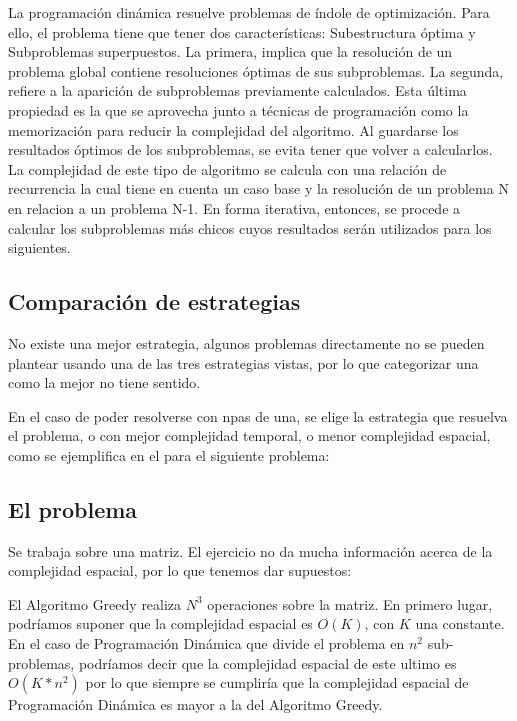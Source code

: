 \documentclass[titlepage,a4paper]{article}
\begin{document}
La programación dinámica resuelve problemas de índole de optimización. Para 
ello, el problema tiene que tener dos características: Subestructura óptima y 
Subproblemas superpuestos. La primera, implica que la resolución de un 
problema global contiene resoluciones óptimas de sus subproblemas. La segunda, 
refiere a la aparición de subproblemas previamente calculados. Esta última 
propiedad es la que se aprovecha junto a técnicas de programación como la 
memorización para reducir la complejidad del algoritmo. Al guardarse los 
resultados óptimos de los subproblemas, se evita tener que volver a calcularlos. 
La complejidad de este tipo de algoritmo se calcula con una relación de 
recurrencia la cual tiene en cuenta un caso base y la resolución de un problema 
N en relacion a un problema N-1. En forma iterativa, entonces, se procede a 
calcular los subproblemas más chicos cuyos resultados serán utilizados 
para los siguientes.

\subsection{Comparación de estrategias}
\label{sec:org14bc352}

No existe una mejor estrategia, algunos problemas directamente no se pueden
plantear usando una de las tres estrategias vistas, por lo que categorizar una
como la mejor no tiene sentido.

En el caso de poder resolverse con npas de una, se elige la estrategia 
que resuelva el problema, o con mejor complejidad temporal, o menor complejidad espacial,
como se ejemplifica en el para el siguiente problema:

\subsection{El problema}
\label{sec:orgc8a8ce8}

Se trabaja sobre una matriz. El ejercicio no da mucha información acerca de la
complejidad espacial, por lo que tenemos dar supuestos:

El Algoritmo Greedy realiza \(N^3\) operaciones sobre la matriz. En primero lugar,
podríamos suponer que la complejidad espacial es \(O(K)\), con \(K\) una constante. 
En el caso de Programación Dinámica que divide el problema en \(n^2\) sub-problemas,
podríamos decir que la complejidad espacial de este ultimo es \(O(K * n^2)\) por lo 
que siempre se cumpliría que la complejidad espacial de Programación Dinámica es
mayor a la del Algoritmo Greedy.
\end{document}
